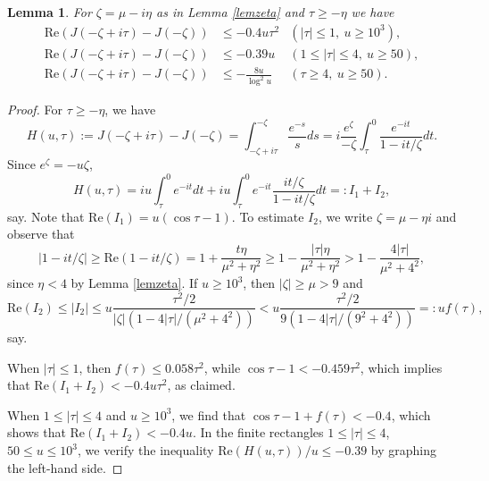 \documentclass[11pt]{amsart}
\newtheorem{lemma}{Lemma}
\begin{document}
\begin{lemma}\label{lemReJk}
For $\zeta=\mu-i\eta$ as in Lemma \ref{lemzeta} and $\tau\ge -\eta$ we have
\begin{align*}
\mathrm{Re}(J(-\zeta+i\tau)-J(-\zeta)) & \le -0.4 u \tau^2  & (|\tau|\le 1,\ u\ge 10^3), \\
\mathrm{Re}(J(-\zeta+i\tau)-J(-\zeta)) & \le -0.39 u   &  (1 \le |\tau|\le 4,\ u\ge 50), \\
\mathrm{Re}(J(-\zeta+i\tau)-J(-\zeta)) & \le - \frac{8u}{\log^2 u} &   (\tau \ge 4,\  u \ge 50).
\end{align*}
\end{lemma}
\begin{proof}
For $\tau \ge -\eta$, we have
\begin{equation}\label{eqHt}
H(u,\tau):=J(-\zeta+i\tau)-J(-\zeta)=\int_{-\zeta+i\tau}^{-\zeta} \frac{e^{-s}}{s} ds = i \frac{e^\zeta}{-\zeta} \int_\tau^0 \frac{e^{-it}}{1-it/\zeta} dt.
\end{equation}
Since $e^\zeta=-u\zeta$,
$$
H(u,\tau)= iu \int_\tau^0 e^{-it} dt + iu  \int_\tau^0 e^{-it} \frac{it/\zeta}{1-it/\zeta} dt =: I_1 + I_2,
$$
say. Note that
$
\mathrm{Re}(I_1) = u(\cos \tau -1).
$
To estimate $I_2$, we write $\zeta=\mu-\eta i$ and observe that 
$$
|1-it/\zeta| \ge \mathrm{Re}(1-it/\zeta) = 1+ \frac{t\eta}{\mu^2+\eta^2}\ge  1- \frac{|\tau|\eta}{\mu^2+\eta^2}
> 1- \frac{4|\tau|}{\mu^2+4^2},
$$
since $\eta<4$ by Lemma \ref{lemzeta}. 
If $u\ge 10^3$, then  $|\zeta|\ge \mu >9$ and
$$
\mathrm{Re}(I_2)\le |I_2| \le u \frac{\tau^2/2}{|\zeta|(1-4|\tau|/(\mu^2+4^2))}<u \frac{\tau^2/2}{9(1-4|\tau|/(9^2+4^2))} =: u  f(\tau),
$$
say.

When $|\tau|\le 1$, then $f(\tau)\le 0.058 \tau^2$, while $\cos \tau -1 < -0.459\tau^2$,
which implies that $\mathrm{Re}(I_1+I_2)< -0.4 u \tau^2$, as claimed.

When $1\le |\tau| \le 4$ and $u\ge 10^3$, 
we find that $\cos \tau -1 + f(\tau) < -0.4$, which shows that $\mathrm{Re}(I_1+I_2)< -0.4 u$.
In the finite rectangles $1\le |\tau| \le 4$, $50\le u \le 10^3$, we verify the inequality
$\mathrm{Re}(H(u,\tau))/u \le -0.39$ by graphing the left-hand side. 


\end{proof}
\end{document}
